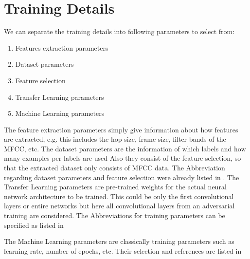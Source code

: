 
\section{Training Details}\label{sec:exp_details}
We can separate the training details into following parameters to select from:
\begin{enumerate}
  \item Features extraction parameters
  \item Dataset parameters
  \item Feature selection
  \item Transfer Learning parameters
  \item Machine Learning parameters
\end{enumerate}
The feature extraction parameters simply give information about how features are extracted, e.g. this includes the hop size, frame size, filter bands of the MFCC, etc.
The dataset parameters are the information of which labels and how many examples per labels are used
Also they consist of the feature selection, so that the extracted dataset only consists of MFCC data. 
The Abbreviation regarding dataset parameters and feature selection were already listed in .
The Transfer Learning parameters are pre-trained weights for the actual neural network architecture to be trained.
This could be only the first convolutional layers or entire networks but here all convolutional layers from an adversarial training are considered. 
The Abbreviations for training parameters can be specified as listed in 


The Machine Learning parameters are classically training parameters such as learning rate, number of epochs, etc.
Their selection and references are listed in 



